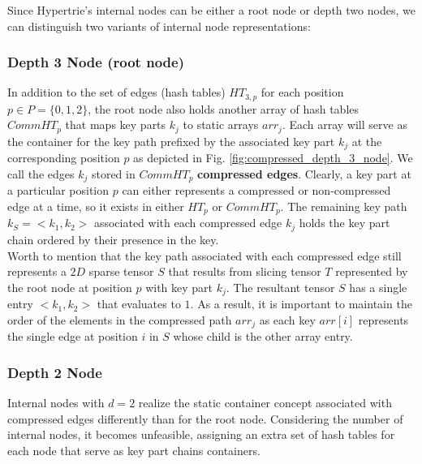 
Since Hypertrie's internal nodes can be either a root node or depth two nodes, we can distinguish two variants of internal node representations: 

\subsubsection{Depth 3 Node (root node)} 
In addition to the set of edges (hash tables) $HT_{3,p}$ for each position $p \in P = \{0, 1, 2\}$, the root node also holds another array of hash tables $CommHT_{p}$ that maps key parts $k_{j}$ to static arrays $arr_{j}$. 
Each array will serve as the container for the key path prefixed by the associated key part $k_{j}$ at the corresponding position $p$ as depicted in Fig. \ref{fig:compressed_depth_3_node}. 
We call the edges $k_{j}$ stored  in $CommHT_{p}$ \textbf{compressed edges}. Clearly, a key part at a particular position $p$ can either represents a compressed or non-compressed edge at a time, so it exists in either $HT_{p}$ or $CommHT_{p}$. 
The remaining key path $k_{S} = <k_{1}, k_{2}>$ associated with each compressed edge $k_{j}$ holds the key part chain ordered by their presence in the key. \\

Worth to mention that the key path associated with each compressed edge still represents a $2D$ sparse tensor $S$ that results from slicing tensor $T$ represented by the root node at position $p$ with key part $k_{j}$. The resultant tensor $S$ has a single entry $<k_{1}, k_{2}>$ that evaluates to $1$. 
As a result, it is important to maintain the order of the elements in the compressed path $arr_{j}$ as each key $arr[i]$ represents the single edge at position $i$ in $S$ whose child is the other array entry. \\

\subsubsection{Depth 2 Node} Internal nodes with $d=2$ realize the static container concept associated with compressed edges differently than for the root node. 
Considering the number of internal nodes, it becomes unfeasible, assigning an extra set of hash tables for each node that serve as key part chains containers. \\

